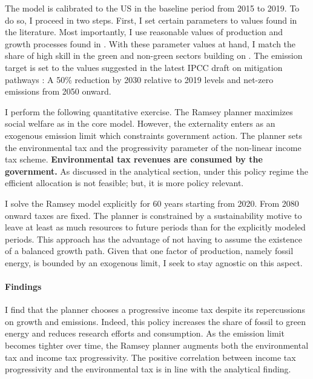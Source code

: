 The model is calibrated to the US in the baseline period from 2015 to 2019. To do so, I proceed in two steps. First, I set certain parameters to values found in the literature. Most importantly, I use reasonable values of production and growth processes found in \cite{Fried2018ClimateAnalysis}. %
With these parameter values at hand, I match the share of high skill in the green and non-green sectors building on \cite{Consoli2016DoCapital}. The emission target is set to the values suggested in the latest IPCC draft on mitigation pathways \citep{IPCC2022}: A 50\% reduction by 2030 relative to 2019 levels and  net-zero emissions from 2050 onward.

I perform the following quantitative exercise. 
The Ramsey planner maximizes social welfare as in the core model. However, the externality enters as an exogenous emission limit which constraints government action. The planner sets the environmental tax and the progressivity parameter of the non-linear income tax scheme. \textbf{Environmental tax revenues are consumed by the government.} As discussed in the analytical section, under this policy regime the efficient allocation is not feasible; but, it is  more policy relevant. 

I solve the Ramsey model explicitly for 60 years starting from 2020. From 2080 onward taxes are fixed. The planner is constrained by a sustainability motive to leave at least as much resources to future periods than for the explicitly modeled periods.
This approach has the advantage of not having to assume the existence of a balanced growth path. Given that one factor of production, namely fossil energy, is bounded by an exogenous limit, I seek to stay agnostic on this aspect.

\paragraph{Findings}
I find that the planner chooses a progressive income tax despite its repercussions on growth and emissions. Indeed, this policy increases the share of fossil to green energy and reduces research efforts and consumption. As the emission limit becomes tighter over time, the Ramsey planner augments both the environmental tax and income tax progressivity. The positive correlation between income tax progressivity and the environmental tax is in line with the analytical finding. 
 

